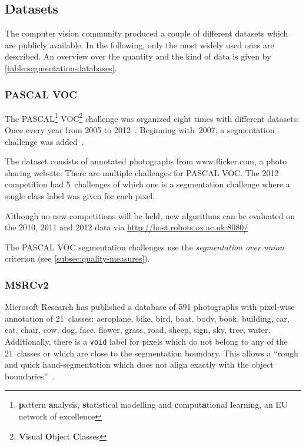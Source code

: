 
\subsection{Datasets}

The computer vision community produced a couple of different datasets which are
publicly available. In the following, only the most widely used ones are
described. An overview over the quantity and the kind of data is given by
\cref{table:segmentation-databases}.


\subsubsection{PASCAL VOC}

The PASCAL\footnote{\textbf{p}attern \textbf{a}nalysis, \textbf{s}tatistical
modelling and \textbf{c}omput\textbf{a}tional \textbf{l}earning, an EU network
of excellence} VOC\footnote{\textbf{V}isual \textbf{O}bject \textbf{C}lasses}
challenge was organized eight times with different datasets: Once every year
from 2005 to 2012~\cite{pascal-voc-2012}. Beginning with~2007, a segmentation
challenge was added~\cite{pascal-voc-2007}.

The dataset consists of annotated photographs from www.flicker.com, a photo
sharing website. There are multiple challenges for PASCAL VOC. The 2012
competition had 5~challenges of which one is a segmentation challenge where
a single class label was given for each pixel.

Although no new competitions will be held, new algorithms can be evaluated on
the 2010, 2011 and 2012 data via
\href{http://host.robots.ox.ac.uk:8080/}{http://host.robots.ox.ac.uk:8080/}

The PASCAL VOC segmentation challenges use the \textit{segmentation over union}
criterion (see \cref{subsec:quality-measures}).


\subsubsection{MSRCv2}

Microsoft Research has published a database of 591 photographs with pixel-wise
annotation of 21~classes: aeroplane, bike, bird, boat, body,
book, building, car, cat, chair, cow, dog, face, flower, grass, road, sheep,
sign, sky, tree, water. Additionally, there is a \texttt{void} label for pixels
which do not belong to any of the 21~classes or which are close to the
segmentation boundary. This allows a \enquote{rough and quick hand-segmentation
which does not align exactly with the object boundaries}~\cite{shotton2006textonboost}.

